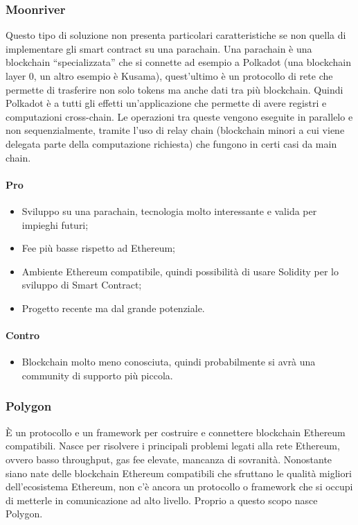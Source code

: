 		\subsubsection{Moonriver}
		Questo tipo di soluzione non presenta particolari caratteristiche se non quella di implementare gli smart contract su una parachain. Una parachain è una blockchain\glo{} “specializzata” che si connette ad esempio a Polkadot (una blockchain\glo{} layer 0\glo{}, un altro esempio è Kusama), quest'ultimo è un protocollo di rete che permette di trasferire non solo tokens ma anche dati tra più blockchain\glo{}. Quindi Polkadot è a tutti gli effetti un'applicazione che permette di avere registri e computazioni cross-chain.
		Le operazioni tra queste vengono eseguite in parallelo e non sequenzialmente, tramite l'uso di relay chain (blockchain\glo{} minori a cui viene delegata parte della computazione richiesta) che fungono in certi casi da main chain.
		\paragraph{Pro}
		\begin{itemize}
			\item Sviluppo su una parachain, tecnologia molto interessante e valida per impieghi futuri;
			\item Fee più basse rispetto ad Ethereum\glo{};
			\item Ambiente Ethereum\glo{} compatibile, quindi possibilità di usare Solidity\glo{} per lo sviluppo di Smart Contract;
			\item Progetto recente ma dal grande potenziale.
		\end{itemize}
		\paragraph{Contro}
		\begin{itemize}
			\item Blockchain\glo{} molto meno conosciuta, quindi probabilmente si avrà una community di supporto più piccola.
		\end{itemize}
		
		\subsubsection{Polygon}
		È un protocollo e un framework per costruire e connettere blockchain\glo{} Ethereum\glo{} compatibili. Nasce per risolvere i principali problemi legati alla rete Ethereum\glo{}, ovvero basso throughput, gas fee elevate, mancanza di sovranità.
		Nonostante siano nate delle blockchain\glo{} Ethereum\glo{} compatibili che sfruttano le qualità migliori dell'ecosistema Ethereum\glo{}, non c'è ancora un protocollo o framework che si occupi di metterle in comunicazione ad alto livello. Proprio a questo scopo nasce Polygon.
	
